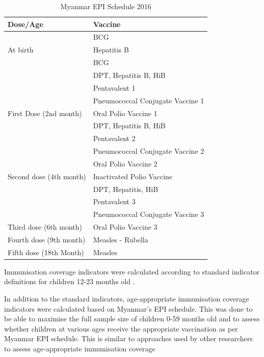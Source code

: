 \documentclass[12pt,a4paper]{article}
\begin{document}
\begin{table}[H]

\caption{\label{tab:epi1}Myanmar EPI Schedule 2016}
\centering
\begin{tabular}[t]{ll}
\toprule
\textbf{Dose/Age} & \textbf{Vaccine}\\
\midrule
 & BCG\\
\cmidrule{2-2}
\multirow{-2}{*}{\raggedright\arraybackslash At birth} & Hepatitis B\\
\cmidrule{1-2}
 & BCG\\
\cmidrule{2-2}
 & DPT, Hepatitis B, HiB\\
\cmidrule{2-2}
 & Pentavalent 1\\
\cmidrule{2-2}
 & Pneumococcal Conjugate Vaccine 1\\
\cmidrule{2-2}
\multirow{-5}{*}{\raggedright\arraybackslash First Dose (2nd month)} & Oral Polio Vaccine 1\\
\cmidrule{1-2}
 & DPT, Hepatitis B, HiB\\
\cmidrule{2-2}
 & Pentavalent 2\\
\cmidrule{2-2}
 & Pneumococcal Conjugate Vaccine 2\\
\cmidrule{2-2}
 & Oral Polio Vaccine 2\\
\cmidrule{2-2}
\multirow{-5}{*}{\raggedright\arraybackslash Second dose (4th month)} & Inactivated Polio Vaccine\\
\cmidrule{1-2}
 & DPT, Hepatitis, HiB\\
\cmidrule{2-2}
 & Pentavalent 3\\
\cmidrule{2-2}
 & Pneumococcal Conjugate Vaccine 3\\
\cmidrule{2-2}
\multirow{-4}{*}{\raggedright\arraybackslash Third dose (6th month)} & Oral Polio Vaccine 3\\
\cmidrule{1-2}
Fourth dose (9th month) & Measles - Rubella\\
\cmidrule{1-2}
Fifth dose (18th Month) & Measles\\
\bottomrule
\end{tabular}
\end{table}

Immunisation coverage indicators were calculated according to standard indicator definitions for children 12-23 months old \citep{WorldHealthOrganization:2005vp, WorldHealthOrganization:1991uh, HoshawWoodard:2001vm}.

In addition to the standard indicators, age-appropriate immunisation coverage indicators were calculated based on Myanmar's EPI schedule. This was done to be able to maximise the full sample size of children 0-59 months old and to assess whether children at various ages receive the appropriate vaccination as per Myanmar EPI schedule. This is similar to approaches used by other researchers to assess age-appropriate immunisation coverage \citep[\citet{Dombkowski:2004bt}]{Kidane:2004uy, Tadesse:2009dm, Odutola:2015bm}
\end{document}
